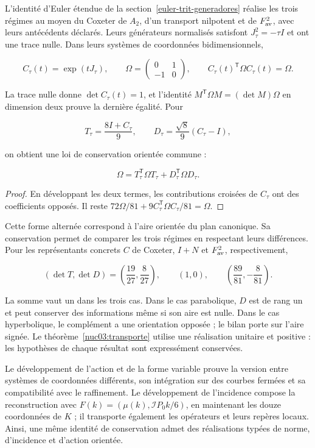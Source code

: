 L’identité d’Euler étendue de la section~\ref{euler-trit-generadores} réalise les trois régimes au moyen du Coxeter de \(A_2\), d’un transport nilpotent et de \(F_{\rm av}^2\), avec leurs antécédents déclarés. Leurs générateurs normalisés satisfont \(J_\tau^2=-\tau I\) et ont une trace nulle. Dans leurs systèmes de coordonnées bidimensionnels,

\[
C_\tau(t)=\exp(tJ_\tau),\qquad
\Omega=\begin{pmatrix}0&1\\-1&0\end{pmatrix},\qquad
C_\tau(t)^\mathsf T\Omega C_\tau(t)=\Omega.
\]

La trace nulle donne \(\det C_\tau(t)=1\), et l’identité \(M^\mathsf T\Omega M=(\det M)\Omega\) en dimension deux prouve la dernière égalité. Pour

\[
T_\tau=\frac{8I+C_\tau}{9},\qquad
D_\tau=\frac{\sqrt8}{9}(C_\tau-I),
\]

on obtient une loi de conservation orientée commune :

\begin{equation}
\boxed{\Omega=T_\tau^\mathsf T\Omega T_\tau+D_\tau^\mathsf T\Omega D_\tau.}
\label{nuc03:eq:22}
\end{equation}

\begin{proof}
En développant les deux termes, les contributions croisées de \(C_\tau\) ont des coefficients opposés. Il reste \(72\Omega/81+9C_\tau^\mathsf T\Omega C_\tau/81=\Omega\).
\end{proof}

Cette forme alternée correspond à l’aire orientée du plan canonique. Sa conservation permet de comparer les trois régimes en respectant leurs différences. Pour les représentants concrets \(C\) de Coxeter, \(I+N\) et \(F_{\rm av}^2\), respectivement,

\begin{equation}
(\det T,\det D)=
\left(\frac{19}{27},\frac8{27}\right),\qquad
(1,0),\qquad
\left(\frac{89}{81},-\frac8{81}\right).
\label{nuc03:eq:23}
\end{equation}

La somme vaut un dans les trois cas. Dans le cas parabolique, \(D\) est de rang un et peut conserver des informations même si son aire est nulle. Dans le cas hyperbolique, le complément a une orientation opposée ; le bilan porte sur l’aire signée. Le théorème~\ref{nuc03:transporte} utilise une réalisation unitaire et positive : les hypothèses de chaque résultat sont expressément conservées.


Le développement de l’action et de la forme variable prouve la version entre systèmes de coordonnées différents, son intégration sur des courbes fermées et sa compatibilité avec le raffinement. Le développement de l’incidence compose la reconstruction avec \(F(k)=(\mu(k),\mathcal I P_0k/6)\), en maintenant les douze coordonnées de \(K\) ; il transporte également les opérateurs et leurs repères locaux. Ainsi, une même identité de conservation admet des réalisations typées de norme, d’incidence et d’action orientée.
